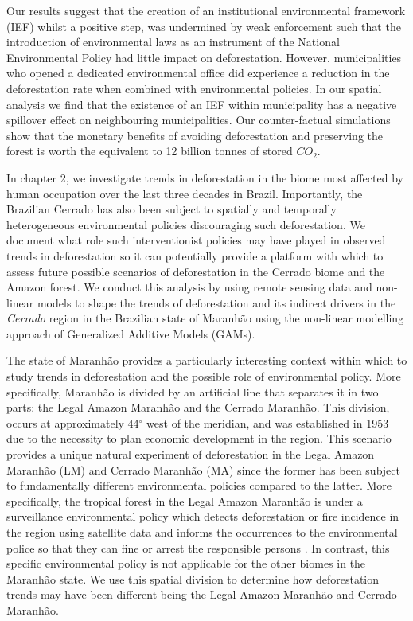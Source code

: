 Our results suggest that the creation of an institutional environmental framework (IEF) whilst a positive step, was undermined by weak enforcement such that the introduction of environmental laws as an instrument of the National Environmental Policy had little impact on deforestation. However, municipalities who opened a dedicated environmental office did experience a reduction in the deforestation rate when combined with environmental policies. In our spatial analysis we find that the existence of an IEF within municipality has a negative spillover effect on neighbouring municipalities. Our counter-factual simulations show that the monetary benefits of avoiding deforestation and preserving the forest is worth the equivalent to 12 billion tonnes of stored $CO_{2}$.


In chapter 2, we investigate trends in deforestation in the biome most affected by human occupation over the last three decades in Brazil. Importantly, the Brazilian Cerrado has also been subject to spatially and temporally heterogeneous environmental policies discouraging such deforestation. We document what role such interventionist policies may have played in observed trends in deforestation so it can potentially provide a platform with which to assess future possible scenarios of deforestation in the Cerrado biome and the Amazon forest. We conduct this analysis by using remote sensing data and non-linear models to shape the trends of deforestation and its indirect drivers in the \textit{Cerrado} region in the Brazilian state of Maranhão using the non-linear modelling approach of Generalized Additive Models (GAMs). 

The state of Maranhão provides a particularly interesting context within which to study trends in deforestation and the possible role of environmental policy. More specifically, Maranhão is divided by an artificial line that separates it in two parts: the Legal Amazon Maranhão and the Cerrado Maranhão. This division, occurs at approximately 44$^{\circ}$ west of the meridian, and was established in 1953 due to the necessity to plan economic development in the region. This scenario provides a unique natural experiment of deforestation in the Legal Amazon Maranhão (LM) and Cerrado Maranhão (MA) since the former has been subject to fundamentally different environmental policies compared to the latter. More specifically, the tropical forest in the Legal Amazon Maranhão is under a surveillance environmental policy which detects deforestation or fire incidence in the region using satellite data and informs the occurrences to the environmental police so that they can fine or arrest the responsible persons \citep{IBAMAwebsite}. In contrast, this specific environmental policy is not applicable for the other biomes in the Maranhão state. We use this spatial division to determine how deforestation trends may have been different being the Legal Amazon Maranhão and Cerrado Maranhão.

